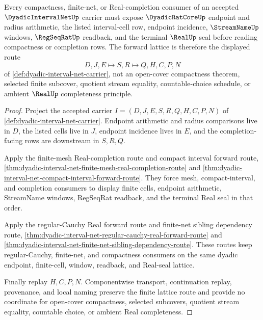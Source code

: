 \begin{theorem}
\label{thm:dyadic-interval-net-forward-lattice-route}
Every compactness, finite-net, or Real-completion consumer of an accepted $\DyadicIntervalNetUp$ carrier must expose $\DyadicRatCoreUp$ endpoint and radius arithmetic, the listed interval-cell row, endpoint incidence, $\StreamNameUp$ windows, $\RegSeqRatUp$ readback, and the terminal $\RealUp$ seal before reading compactness or completion rows. The forward lattice is therefore the displayed route
$$
D,J,E \longmapsto S,R \longmapsto Q,H,C,P,N
$$
of \autoref{def:dyadic-interval-net-carrier}, not an open-cover compactness theorem, selected finite subcover, quotient stream equality, countable-choice schedule, or ambient $\RealUp$ completeness principle.
\end{theorem}
\begin{proof}
Project the accepted carrier $I=(D,J,E,S,R,Q,H,C,P,N)$ of \autoref{def:dyadic-interval-net-carrier}. Endpoint arithmetic and radius comparisons live in $D$, the listed cells live in $J$, endpoint incidence lives in $E$, and the completion-facing rows are downstream in $S,R,Q$.

Apply the finite-mesh Real-completion route and compact interval forward route, \autoref{thm:dyadic-interval-net-finite-mesh-real-completion-route} and \autoref{thm:dyadic-interval-net-compact-interval-forward-route}. They force mesh, compact-interval, and completion consumers to display finite cells, endpoint arithmetic, StreamName windows, RegSeqRat readback, and the terminal Real seal in that order.

Apply the regular-Cauchy Real forward route and finite-net sibling dependency route, \autoref{thm:dyadic-interval-net-regular-cauchy-real-forward-route} and \autoref{thm:dyadic-interval-net-finite-net-sibling-dependency-route}. These routes keep regular-Cauchy, finite-net, and compactness consumers on the same dyadic endpoint, finite-cell, window, readback, and Real-seal lattice.

Finally replay $H,C,P,N$. Componentwise transport, continuation replay, provenance, and local naming preserve the finite lattice route and provide no coordinate for open-cover compactness, selected subcovers, quotient stream equality, countable choice, or ambient Real completeness.
\end{proof}
